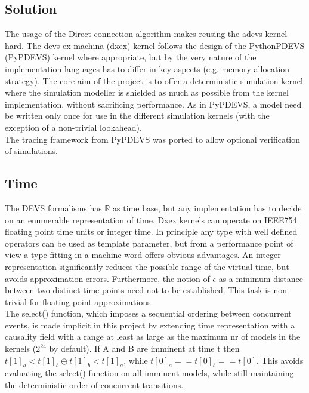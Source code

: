 \subsection{Solution} %
The usage of the Direct connection algorithm makes reusing the adevs kernel hard.
The devs-ex-machina (dxex) kernel follows the design of the PythonPDEVS \cite{PythonPDEVS}(PyPDEVS) kernel where appropriate, but by the very nature of the implementation languages has to differ in key aspects (e.g. memory allocation strategy). 
The core aim of the project is to offer a deterministic simulation kernel where the simulation modeller is shielded as much as possible from the kernel implementation, without sacrificing performance. As in PyPDEVS, a model need be written only once for use in the different simulation kernels (with the exception of a non-trivial lookahead).\\
The tracing framework from PyPDEVS was ported to allow optional verification of simulations. 
\subsection{Time}
The DEVS formalisms has $\mathbb{R}$ as time base, but any implementation has to decide on an enumerable representation of time. Dxex kernels can operate on IEEE754 floating point time units or integer time. In principle any type with well defined operators can be used as template parameter, but from a performance point of view a type fitting in a machine word offers obvious advantages.%
An integer representation significantly reduces the possible range of the virtual time, but avoids approximation errors. Furthermore, the notion of $\epsilon$ as a minimum distance between two distinct time points need not to be established. This task is non-trivial for floating point approximations.\\
The select() function, which imposes a sequential ordering between concurrent events, is made implicit in this project by extending time representation with a causality field with a range at least as large as the maximum nr of models in the kernels ($2^{24}$ by default). If A and B are imminent at time t then $t[1]_a < t[1]_b \oplus t[1]_b < t[1]_a$, while $t[0]_a == t[0]_b == t[0]$. This avoids evaluating the select() function on all imminent models, while still maintaining the deterministic order of concurrent transitions.
